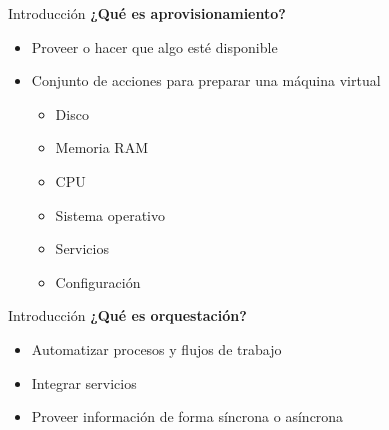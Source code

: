 \begin{frame}{Introducción}
    \vspace{0cm}
    \textbf{¿Qué es aprovisionamiento?}
    \begin{itemize}
        \item Proveer o hacer que algo esté disponible
        \item Conjunto de acciones para preparar una máquina virtual
        \begin{itemize}
            \item Disco
            \item Memoria RAM
            \item CPU
            \item Sistema operativo
            \item Servicios
            \item Configuración
        \end{itemize}
    \end{itemize}


\end{frame}

\begin{frame}{Introducción}
    \vspace{0cm}
    \textbf{¿Qué es orquestación?}
    \begin{itemize}
        \item Automatizar procesos y flujos de trabajo
        \item Integrar servicios
        \item Proveer información de forma síncrona o asíncrona
    \end{itemize}

\end{frame}
